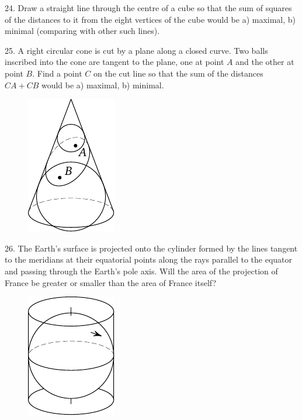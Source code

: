 \begin{problem}{24.}
	Draw a straight line through the centre of a cube so that the sum of squares of the distances to it
	from the eight vertices of the cube would be
	a) maximal,
	b) minimal (comparing with other such lines).
\end{problem}

\begin{problem}{25.}
	A right circular cone is cut by a plane along a closed curve. Two balls inscribed into the cone
	are tangent to the plane, one at point $A$ and the other at point $B$. Find a point $C$ on the cut line so
	that the sum of the distances $CA + CB$ would be a) maximal, b) minimal.
	\begin{figure}
		\includegraphics{resources/taskbook-9}
	\end{figure}
\end{problem}

\begin{problem}{26.}
	The Earth's surface is projected onto the cylinder formed by the lines tangent to the meridians
	at their equatorial points along the rays parallel to the equator and passing through the Earth's pole axis.
	Will the area of the projection of France be greater or smaller than the area of France itself?
	\begin{figure}
		\includegraphics{resources/taskbook-10}
	\end{figure}
\end{problem}

